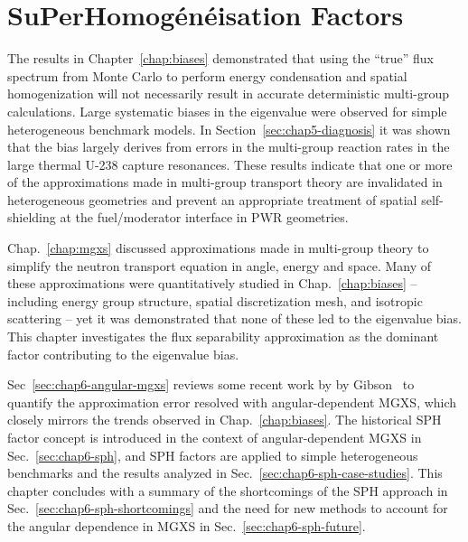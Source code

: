 \chapter{SuPerHomog\'{e}n\'{e}isation Factors}
\label{chap:sph}

The results in Chapter~\ref{chap:biases} demonstrated that using the ``true'' flux spectrum from Monte Carlo to perform energy condensation and spatial homogenization will not necessarily result in accurate deterministic multi-group calculations. Large systematic biases in the eigenvalue were observed for simple heterogeneous benchmark models. In Section~\ref{sec:chap5-diagnosis} it was shown that the bias largely derives from errors in the multi-group reaction rates in the large thermal U-238 capture resonances. These results indicate that one or more of the approximations made in multi-group transport theory are invalidated in heterogeneous geometries and prevent an appropriate treatment of spatial self-shielding at the fuel/moderator interface in \ac{PWR} geometries.



Chap.~\ref{chap:mgxs} discussed approximations made in multi-group theory to simplify the neutron transport equation in angle, energy and space. Many of these approximations were quantitatively studied in Chap.~\ref{chap:biases} -- including energy group structure, spatial discretization mesh, and isotropic scattering -- yet it was demonstrated that none of these led to the eigenvalue bias. This chapter investigates the flux separability approximation as the dominant factor contributing to the eigenvalue bias.

Sec~\ref{sec:chap6-angular-mgxs} reviews some recent work by by Gibson~\cite{gibson2016thesis} to quantify the approximation error resolved with angular-dependent \ac{MGXS}, which closely mirrors the trends observed in Chap.~\ref{chap:biases}. The historical \ac{SPH} factor concept is introduced in the context of angular-dependent \ac{MGXS} in Sec.~\ref{sec:chap6-sph}, and \ac{SPH} factors are applied to simple heterogeneous benchmarks and the results analyzed in Sec.~\ref{sec:chap6-sph-case-studies}. This chapter concludes with a summary of the shortcomings of the \ac{SPH} approach in Sec.~\ref{sec:chap6-sph-shortcomings} and the need for new methods to account for the angular dependence in \ac{MGXS} in Sec.~\ref{sec:chap6-sph-future}.

